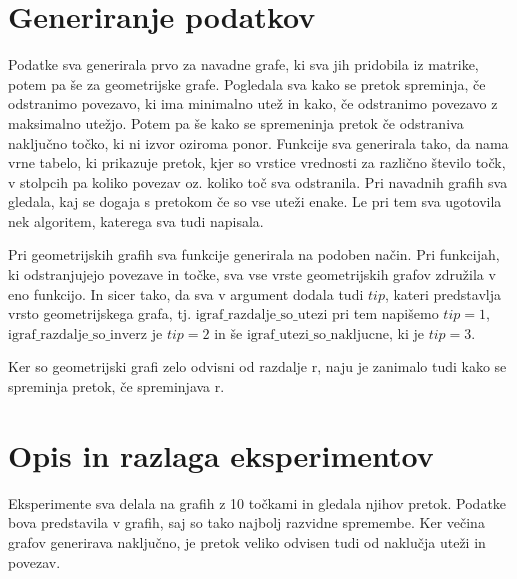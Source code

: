 \documentclass[a4paper]{article}
\begin{document}
\section{Generiranje podatkov}
Podatke sva generirala prvo za navadne grafe, ki sva jih pridobila iz matrike, potem pa še za geometrijske grafe. Pogledala sva kako se pretok spreminja, če odstranimo povezavo, ki ima minimalno utež in kako, če odstranimo povezavo z maksimalno utežjo. Potem pa še kako se spremeninja pretok če odstraniva naključno točko, ki ni izvor oziroma ponor. Funkcije sva generirala tako, da nama vrne tabelo, ki prikazuje pretok, kjer so  vrstice vrednosti za različno število točk, v stolpcih pa koliko povezav oz. koliko toč sva odstranila. Pri navadnih grafih sva gledala, kaj se dogaja s pretokom če so vse uteži enake. Le pri tem sva ugotovila nek algoritem, katerega sva tudi napisala. 

Pri geometrijskih grafih sva funkcije generirala na podoben način. Pri funkcijah, ki odstranjujejo povezave in točke, sva vse vrste geometrijskih grafov združila v eno funkcijo. In sicer tako, da sva v argument dodala tudi $tip$, kateri predstavlja vrsto geometrijskega grafa, tj. $\text{igraf\_razdalje\_so\_utezi}$ pri tem napišemo $tip = 1$, $\text{igraf\_razdalje\_so\_inverz}$ je $tip = 2$ in še $\text{igraf\_utezi\_so\_nakljucne}$, ki je $tip = 3.$

Ker so geometrijski grafi zelo odvisni od razdalje r, naju je zanimalo tudi kako se spreminja pretok, če spreminjava r. 

\section{Opis in razlaga eksperimentov}

Eksperimente sva delala na grafih z 10 točkami in gledala njihov pretok. Podatke bova predstavila v grafih, saj so tako najbolj razvidne spremembe. Ker večina grafov generirava naključno, je pretok veliko odvisen tudi od naklučja uteži in povezav. 
\end{document}
